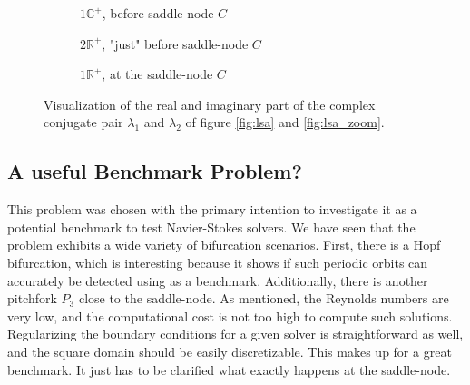 \begin{figure}[h]
\centering
\begin{subfigure}[b]{0.3\textwidth}
  \centering
  \caption{$1\mathbb{C}^+$, before saddle-node $C$ \newline}
\end{subfigure}
\begin{subfigure}[b]{0.3\textwidth}
  \centering
\caption{$2\mathbb{R}^+$, "just" before saddle-node $C$}
\end{subfigure}
\begin{subfigure}[b]{0.3\textwidth}
  \centering
\caption{$1\mathbb{R}^+$, at the saddle-node $C$ \newline}
\end{subfigure}
\caption{Visualization of the real and imaginary part of the complex conjugate pair
  $\lambda_1$ and $\lambda_2$ of figure \ref{fig:lsa} and \ref{fig:lsa_zoom}.}
\label{fig:complexplane}
\end{figure} 

\subsection{A useful Benchmark Problem?}

This problem was chosen with the primary intention to investigate it as a
potential benchmark to test Navier-Stokes solvers. We have seen that the
problem exhibits a wide variety of bifurcation scenarios. First, there is a
Hopf bifurcation, which is interesting because it shows if such periodic orbits
can accurately be detected using as a benchmark. Additionally, there is another
pitchfork $P_3$ close to the saddle-node. As mentioned, the Reynolds numbers
are very low, and the computational cost is not too high to compute such
solutions. Regularizing the boundary conditions for a given solver is
straightforward as well, and the square domain should be easily discretizable.
This makes up for a great benchmark. It just has to be clarified what exactly
happens at the saddle-node.

